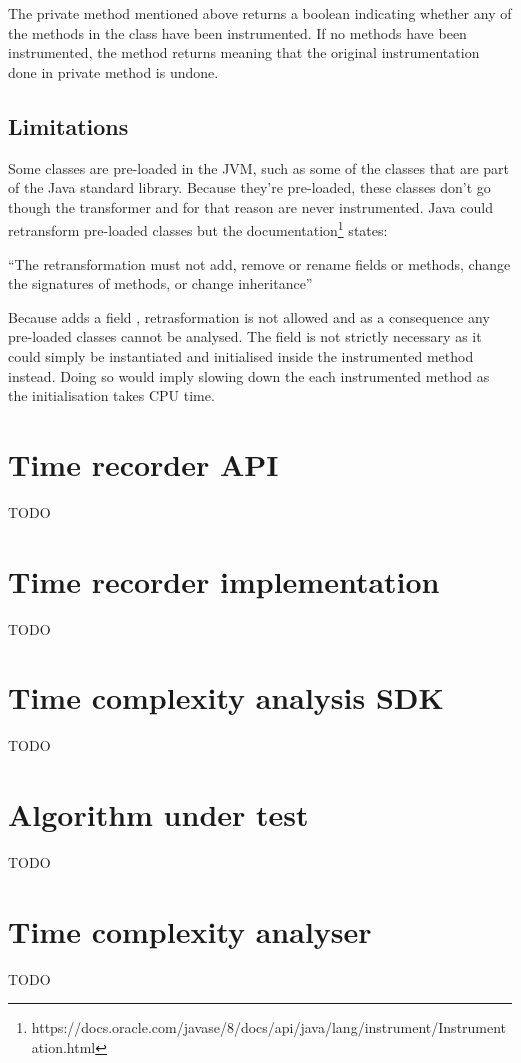 \noindent The private method  mentioned above returns a boolean indicating whether any of the methods in the class have been instrumented. If no methods have been instrumented, the  method returns  meaning that the original instrumentation done in private method  is undone.

\subsection{Limitations}
\label{sec:implementation:agent:limitations}
Some classes are pre-loaded in the JVM, such as some of the classes that are part of the Java standard library. Because they're pre-loaded, these classes don't go though the transformer and for that reason are never instrumented. Java could retransform pre-loaded classes but the documentation\footnote{https://docs.oracle.com/javase/8/docs/api/java/lang/instrument/Instrumentation.html} states:

\enquote{The retransformation must not add, remove or rename fields or methods, change the signatures of methods, or change inheritance}

\noindent Because  adds a field , retrasformation is not allowed and as a consequence any pre-loaded classes cannot be analysed. The field is not strictly necessary as it could simply be instantiated and initialised inside the instrumented method instead. Doing so would imply slowing down the each instrumented method as the initialisation takes CPU time.

\section{Time recorder API}
\label{sec:implementation:timerecorderapi}

TODO


\section{Time recorder implementation}
\label{sec:implementation:timerecorderimplementation}

TODO


\section{Time complexity analysis SDK}

TODO


\section{Algorithm under test}

TODO


\section{Time complexity analyser}
\label{sec:implementation:timecomplexityanalyser} 
TODO
